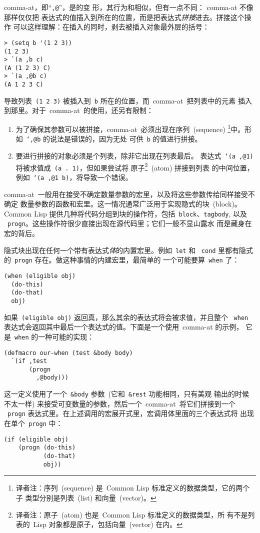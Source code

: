 comma-at，即``\texttt{,@}''，是\comma{}的变
形，其行为和\comma{}相似，但有一点不同： comma-at 不像\comma{}那样仅仅把
表达式的值插入到所在的位置，而是把表达式\emph{拼接}进去。拼接这个操作
可以这样理解：在插入的同时，剥去被插入对象最外层的括号：
\begin{lstlisting}
> (setq b '(1 2 3))
(1 2 3)
> `(a ,b c)
(A (1 2 3) C)
> `(a ,@b c)
(A 1 2 3 C)
\end{lstlisting}

\comma{}导致列表~\texttt{(1 2 3)} 被插入到~\texttt{b} 所在的位置，而~comma-at~把列表中的元素
插入到那里。对于~comma-at~的使用，还另有限制：
\begin{enumerate}
\item 为了确保其参数可以被拼接，comma-at~必须出现在序列~(sequence)
\footnote{译者注：序列~(sequence) 是~Common Lisp 标准定义的数据类型，它的两个子
类型分别是列表~(list) 和向量~(vector)。}中。形如~\texttt{`,@b} 的说法是错误的，因为无处
可供~\texttt{b} 的值进行拼接。
\item 要进行拼接的对象必须是个列表，除非它出现在列表最后。
表达式~\texttt{`(a ,@1)} 将被求值成~\texttt{(a . 1)}，但如果尝试将
原子\footnote{译者注：原子~(atom) 也是~Common Lisp 标准定义的数据类型，所
有不是列表的~Lisp 对象都是原子，包括向量~(vector) 在内。}~(atom) 拼接到列表
的中间位置，例如~\texttt{`(a ,@1 b)}，将导致一个错误。
\end{enumerate}

comma-at~一般用在接受不确定数量参数的宏里，以及将这些参数传给同样接受不确定
数量参数的函数和宏里。这一情况通常广泛用于实现隐式的块~(block)。Common Lisp
提供几种将代码分组到块的操作符，包括~\texttt{block}、\texttt{tagbody}, 以及
~\texttt{progn}。这些操作符很少直接出现在源代码里；它们一般不显山露水\pozhehao{}
而是藏身在宏的背后。

隐式块出现在任何一个带有表达式\emph{体}的内置宏里。例如~\texttt{let} 和
~\texttt{cond} 里都有隐式的~\texttt{progn} 存在。做这种事情的内建宏里，最简单的
一个可能要算~\texttt{when} 了：
\begin{lstlisting}
(when (eligible obj)
  (do-this)
  (do-that)
  obj)
\end{lstlisting}
如果~\texttt{(eligible obj)} 返回真，那么其余的表达式将会被求值，并且整个
~\texttt{when} 表达式会返回其中最后一个表达式的值。下面是一个使用~comma-at 的示例，
它是~\texttt{when} 的一种可能的实现：
\begin{lstlisting}
(defmacro our-when (test &body body)
  `(if ,test
       (progn
         ,@body)))
\end{lstlisting}
这一定义使用了一个~\texttt{\&body} 参数~(它和~\texttt{\&rest} 功能相同，只有美观
输出的时候不太一样) 来接受可变数量的参数，然后一个~comma-at~将它们拼接到一个
~\texttt{progn} 表达式里。在上述调用的宏展开式里，宏调用体里面的三个表达式将
出现在单个~\texttt{progn} 中：
\begin{lstlisting}
(if (eligible obj)
    (progn (do-this)
           (do-that)
           obj))
\end{lstlisting}

